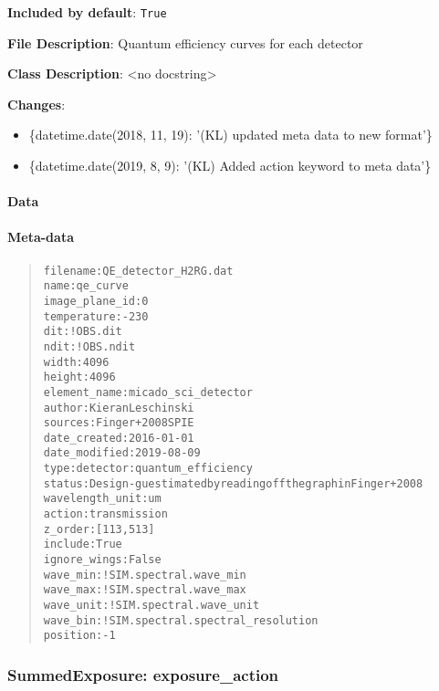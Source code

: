 \textbf{Included by default}: \texttt{True}

\textbf{File Description}: Quantum efficiency curves for each detector

\textbf{Class Description}: <no docstring>

\textbf{Changes}:

\begin{itemize}
\item \{datetime.date(2018, 11, 19): '(KL) updated meta data to new format'\}

\item \{datetime.date(2019, 8, 9): '(KL) Added action keyword to meta data'\}
\end{itemize}


\paragraph{Data%
  \label{id1}%
}


\paragraph{Meta-data%
  \label{id2}%
}

\begin{quote}
\begin{alltt}
       filename : QE_detector_H2RG.dat
           name : qe_curve
 image_plane_id : 0
    temperature : -230
            dit : !OBS.dit
           ndit : !OBS.ndit
          width : 4096
         height : 4096
   element_name : micado_sci_detector
         author : Kieran Leschinski
        sources : Finger+ 2008 SPIE
   date_created : 2016-01-01
  date_modified : 2019-08-09
           type : detector:quantum_efficiency
         status : Design - guestimated by reading off the graph in Finger+ 2008
wavelength_unit : um
         action : transmission
        z_order : [113, 513]
        include : True
   ignore_wings : False
       wave_min : !SIM.spectral.wave_min
       wave_max : !SIM.spectral.wave_max
      wave_unit : !SIM.spectral.wave_unit
       wave_bin : !SIM.spectral.spectral_resolution
       position : -1
\end{alltt}
\end{quote}


\subsubsection{SummedExposure: \textquotedbl{}exposure\_action\textquotedbl{}%
  \label{summedexposure-exposure-action}%
}

